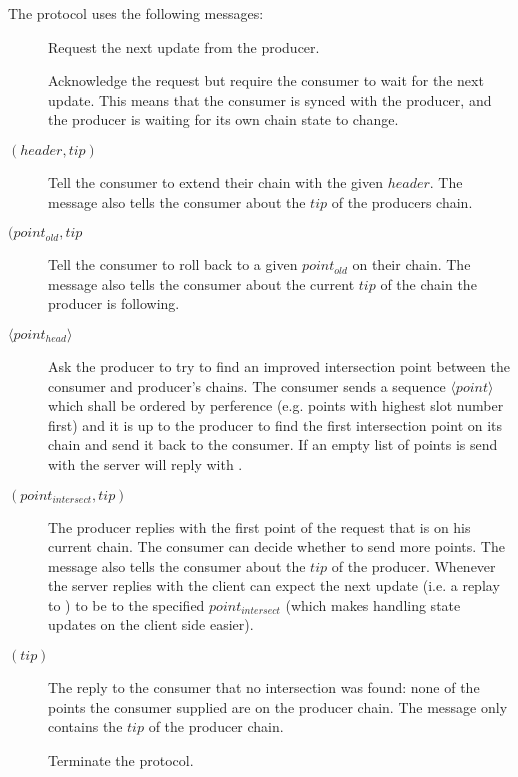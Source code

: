 The protocol uses the following messages:
\begin{description}
\item [\MsgRequestNext]
      Request the next update from the producer.
\item [\MsgAwaitReply]
      Acknowledge the request but require the consumer to wait for the next update.
      This means that the consumer is synced with the producer, and
      the producer is waiting for its own chain state to change.
\item [\MsgRollForward{} {\boldmath $(header, tip)$}]
      Tell the consumer to extend their chain with the given $header$.
      The message also tells the consumer about the $tip$ of the producers chain.
\item [\MsgRollBackward{} {\boldmath $(point_{old}, tip$}]
      Tell the consumer to roll back to a given $point_{old}$ on their chain.
      The message also tells the consumer about the current  $tip$ of the chain the producer is following.
\item [\MsgFindIntersect{} {\boldmath $\langle point_{head} \rangle $}]
      Ask the producer to try to find an improved intersection point between
      the consumer and producer's chains.
      The consumer sends a sequence {\boldmath $\langle point \rangle $} which
      shall be ordered by perference (e.g. points with highest slot number
      first) and it is up to the producer to find the first intersection point
      on its chain and send it back to the consumer.  If an empty list of
      points is send with \MsgFindIntersect{} the server will reply with
      \MsgIntersectNotFound{}.
\item [\MsgIntersectFound{} {\boldmath $(point_{intersect} ,tip)$}]
      The producer replies with the first point of the request that is on his current chain.
      The consumer can decide whether to send more points.
      The message also tells the consumer about the $tip$ of the producer.
      Whenever the server replies with \MsgIntersectFound{} the client can
      expect the next update (i.e. a replay to \MsgRequestNext{}) to be
      \MsgRollBackward{} to the specified $point_{intersect}$ (which makes
      handling state updates on the client side easier).
\item [\MsgIntersectNotFound{} {\boldmath $(tip)$}]
      The reply to the consumer that no intersection was found: none of the
      points the consumer supplied are on the producer chain.
      The message only contains the $tip$ of the producer chain.
\item [\MsgDone]
      Terminate the protocol.
\end{description}


